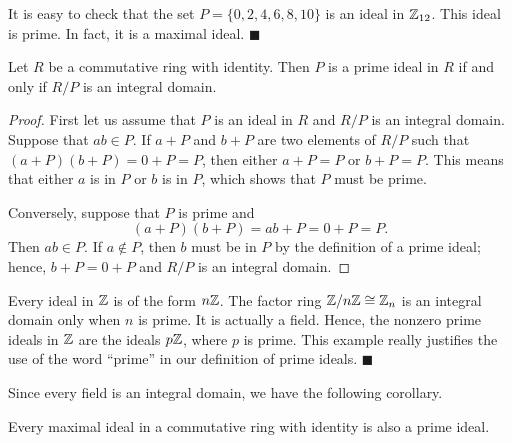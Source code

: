  
\vspace{3.5ex}
 
 
It is easy to check that the set $P = \{ 0, 2, 4, 6, 8, 10  \}$ is an
ideal in ${\Bbb Z}_{12}$. This ideal is prime. In fact, it is a
maximal ideal.
\hspace{\fill} $\blacksquare$
 
 
\begin{proposition}
Let $R$ be a commutative ring with identity. Then $P$ is a prime ideal
in $R$ if and only if $R/P$ is an integral domain.  
\end{proposition}
 
 
\begin{proof}
First let us assume that $P$ is an ideal in $R$ and $R/P$ is an
integral domain.  Suppose that $ab \in P$. If $a +P$ and $b+P$ are two 
elements of $R/P$ such that $(a+P)(b+P) = 0+P = P$, then either $a + P
= P$ or $b+P = P$.  This means that either $a$ is in $P$ or $b$ is in
$P$, which shows that $P$ must be prime. 
 
 
Conversely, suppose that $P$ is prime and 
\[
(a +P)(b+P) = ab + P = 0 + P = P. 
\]
Then $ab \in P$. If $a \notin P$, then $b$ must be in $P$ by the
definition of a prime ideal; hence, $b + P = 0 + P$ and $R/P$ is an
integral domain. 
\end{proof}
 
 
\vspace{3.5ex}
 
 
Every ideal in ${\Bbb Z}$ is of the form $n {\Bbb Z}$.  The factor
ring ${\Bbb Z} / n{\Bbb Z} \cong {\Bbb Z}_n$ is an integral domain
only when $n$ is prime.  It is actually a field.  Hence, the nonzero
prime ideals in ${\Bbb Z}$ are the ideals $p{\Bbb Z}$, where $p$ is
prime. This example really justifies the use of the word ``prime'' in
our  definition of prime ideals. 
\mbox{\hspace{1in}}  
\hspace{\fill} $\blacksquare$
 
 
\vspace{3.5ex}
 
 
Since every field is an integral domain, we have the following
corollary.
 
 

 
 
\begin{corollary}
Every maximal ideal in a commutative ring with identity is also a
prime ideal. 
\end{corollary}
 
